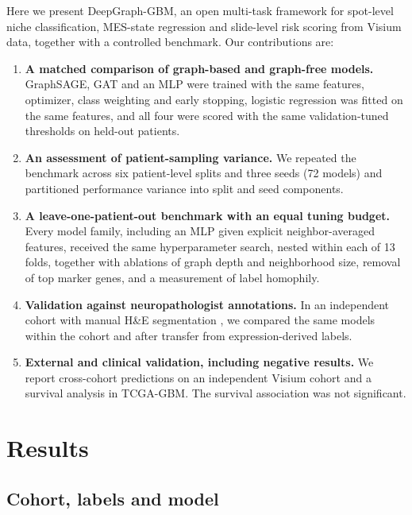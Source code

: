 \documentclass[11pt,letterpaper]{article}
\begin{document}
Here we present DeepGraph-GBM, an open multi-task framework for spot-level niche classification, MES-state regression and slide-level risk scoring from Visium data, together with a controlled benchmark. Our contributions are:
\begin{enumerate}
  \item \textbf{A matched comparison of graph-based and graph-free models.} GraphSAGE, GAT and an MLP were trained with the same features, optimizer, class weighting and early stopping, logistic regression was fitted on the same features, and all four were scored with the same validation-tuned thresholds on held-out patients.
  \item \textbf{An assessment of patient-sampling variance.} We repeated the benchmark across six patient-level splits and three seeds (72 models) and partitioned performance variance into split and seed components.
  \item \textbf{A leave-one-patient-out benchmark with an equal tuning budget.} Every model family, including an MLP given explicit neighbor-averaged features, received the same hyperparameter search, nested within each of 13 folds, together with ablations of graph depth and neighborhood size, removal of top marker genes, and a measurement of label homophily.
  \item \textbf{Validation against neuropathologist annotations.} In an independent cohort with manual H\&E segmentation \cite{ravi2022,ritter2025}, we compared the same models within the cohort and after transfer from expression-derived labels.
  \item \textbf{External and clinical validation, including negative results.} We report cross-cohort predictions on an independent Visium cohort and a survival analysis in TCGA-GBM. The survival association was not significant.
\end{enumerate}

\section{Results}

\subsection{Cohort, labels and model}
\end{document}
